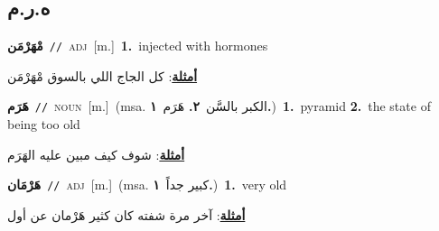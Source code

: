 \documentclass[10pt,a4paper,twoside]{article} %
\begin{document}
\begin{multicols}{2}
\vspace{-3mm}
\subsection*{\color{blue}\foreignlanguage{arabic}{ه.ر.م}\color{blue}{}} 

{\setlength\topsep{0pt}\textbf{\foreignlanguage{arabic}{مْهَرْمَن}}\ {\color{gray}\texttt{//}\color{black}}\ \textsc{adj}\ [m.]\ \textbf{1.}~injected with hormones\  \begin{flushright}\color{gray}\foreignlanguage{arabic}{\textbf{\underline{\foreignlanguage{arabic}{أمثلة}}}: كل الجاج اللي بالسوق مْهَرْمَن}\end{flushright}\color{black}} \vspace{2mm}

{\setlength\topsep{0pt}\textbf{\foreignlanguage{arabic}{هَرَم}}\ {\color{gray}\texttt{//}\color{black}}\ \textsc{noun}\ [m.]\ \color{gray}(msa. \foreignlanguage{arabic}{الكبر بالسَّن}~\foreignlanguage{arabic}{\textbf{٢.}}  \foreignlanguage{arabic}{هَرَم}~\foreignlanguage{arabic}{\textbf{١.}})\color{black}\ \textbf{1.}~pyramid  \textbf{2.}~the state of being too old\  \begin{flushright}\color{gray}\foreignlanguage{arabic}{\textbf{\underline{\foreignlanguage{arabic}{أمثلة}}}: شوف كيف مبين عليه الهَرَم}\end{flushright}\color{black}} \vspace{2mm}

{\setlength\topsep{0pt}\textbf{\foreignlanguage{arabic}{هَرْمَان}}\ {\color{gray}\texttt{//}\color{black}}\ \textsc{adj}\ [m.]\ \color{gray}(msa. \foreignlanguage{arabic}{كبير جداً}~\foreignlanguage{arabic}{\textbf{١.}})\color{black}\ \textbf{1.}~very old\  \begin{flushright}\color{gray}\foreignlanguage{arabic}{\textbf{\underline{\foreignlanguage{arabic}{أمثلة}}}: آخر مرة شفته كان كثير هَرْمان عن أول}\end{flushright}\color{black}} \vspace{2mm}


\end{multicols}
\end{document}
